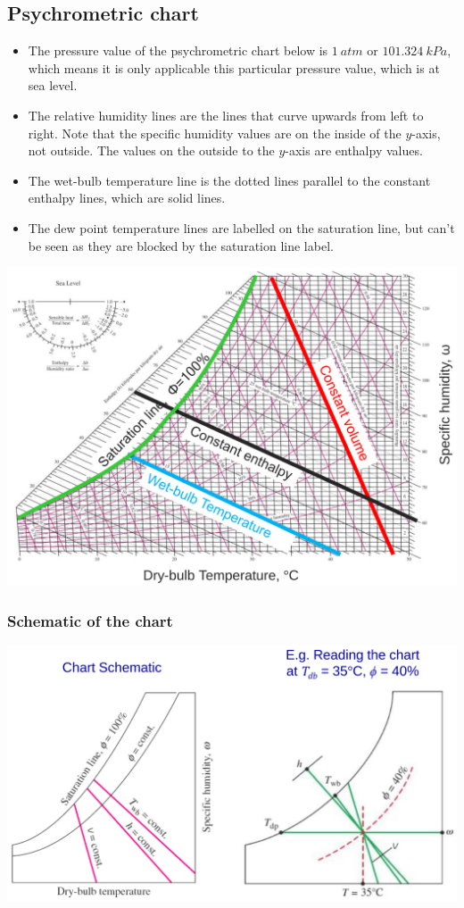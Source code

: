 \documentclass[11pt]{article}
\begin{document}
\subsection{Psychrometric chart}
\label{sec:orgb816206}
\begin{itemize}
\item The pressure value of the psychrometric chart below is \(\qty{1}{atm}\) or \(\qty{101.324}{kPa}\), which means it is only applicable this particular pressure value, which is at sea level.
\item The relative humidity lines are the lines that curve upwards from left to right. Note that the specific humidity values are on the inside of the \(y\)-axis, not outside. The values on the outside to the \(y\)-axis are enthalpy values.
\item The wet-bulb temperature line is the dotted lines parallel to the constant enthalpy lines, which are solid lines.
\item The dew point temperature lines are labelled on the saturation line, but can't be seen as they are blocked by the saturation line label.
\end{itemize}
\begin{center}
\includegraphics[width=.9\linewidth]{./images/psychrometric-chart.png}
\end{center}
\subsubsection{Schematic of the chart}
\label{sec:orge8bc52d}
\begin{center}
\includegraphics[width=.9\linewidth]{./images/psychrometric-chart-schematic.png}
\end{center}
\end{document}
